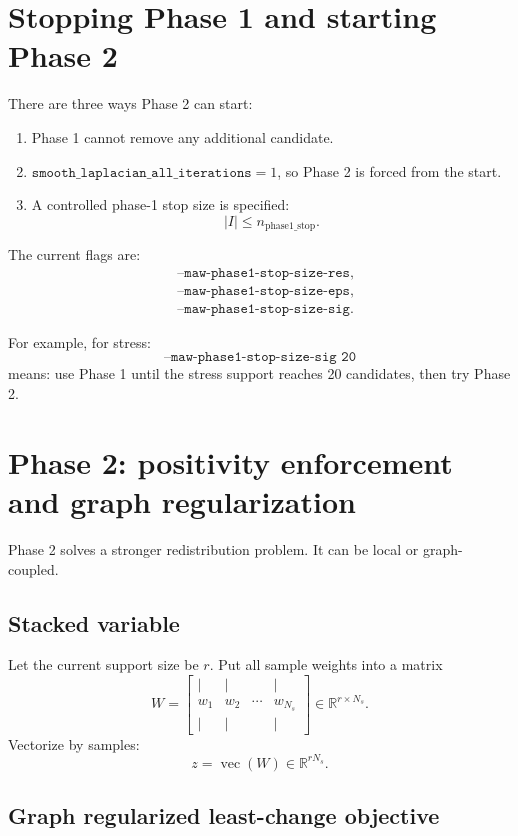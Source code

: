 \documentclass[11pt]{article}
\newcommand{\R}{\mathbb{R}}
\begin{document}
\section{Stopping Phase 1 and starting Phase 2}

There are three ways Phase 2 can start:
\begin{enumerate}[label=\arabic*.]
  \item Phase 1 cannot remove any additional candidate.
  \item \(\texttt{smooth\_laplacian\_all\_iterations}=1\), so Phase 2 is forced from the start.
  \item A controlled phase-1 stop size is specified:
  \[
    |I|\le n_{\mathrm{phase1\_stop}}.
  \]
\end{enumerate}

The current flags are:
\[
\begin{aligned}
&\texttt{--maw-phase1-stop-size-res},\\
&\texttt{--maw-phase1-stop-size-eps},\\
&\texttt{--maw-phase1-stop-size-sig}.
\end{aligned}
\]

For example, for stress:
\[
  \texttt{--maw-phase1-stop-size-sig 20}
\]
means: use Phase 1 until the stress support reaches 20 candidates, then try Phase 2.

\section{Phase 2: positivity enforcement and graph regularization}

Phase 2 solves a stronger redistribution problem.  It can be local or graph-coupled.

\subsection{Stacked variable}

Let the current support size be \(r\).  Put all sample weights into a matrix
\[
  W =
  \begin{bmatrix}
  | & | & & |\\
  w_1 & w_2 & \cdots & w_{N_s}\\
  | & | & & |
  \end{bmatrix}
  \in\R^{r\times N_s}.
\]
Vectorize by samples:
\[
  z = \operatorname{vec}(W)\in\R^{rN_s}.
\]

\subsection{Graph regularized least-change objective}
\end{document}
